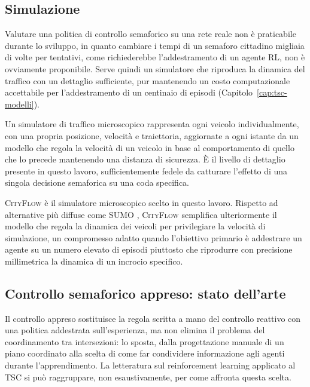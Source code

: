 \subsection{Simulazione}
\label{subsec:background-simulazione}

Valutare una politica di controllo semaforico su una rete reale non è
praticabile durante lo sviluppo, in quanto cambiare i tempi di un semaforo cittadino
migliaia di volte per tentativi, come richiederebbe l'addestramento di un
agente RL, non è ovviamente proponibile. Serve quindi un simulatore che
riproduca la dinamica del traffico con un dettaglio sufficiente, pur
mantenendo un costo computazionale accettabile per l'addestramento di
un centinaio di episodi (Capitolo~\ref{cap:tsc-modelli}).

Un simulatore di traffico microscopico rappresenta ogni veicolo
individualmente, con una propria posizione, velocità e traiettoria,
aggiornate a ogni istante da un modello che regola la velocità di un
veicolo in base al comportamento di quello che lo precede mantenendo una distanza di sicurezza.
È il livello di dettaglio presente in questo lavoro, sufficientemente fedele da catturare l'effetto di una singola
decisione semaforica su una coda specifica.

\textsc{CityFlow} \citep{zhang2019cityflow} è il simulatore microscopico scelto in questo lavoro. Rispetto ad alternative più diffuse
come SUMO \citep{lopez2018sumo}, \textsc{CityFlow} semplifica ulteriormente il modello che regola la dinamica dei veicoli per privilegiare la velocità di simulazione,
un compromesso adatto quando l'obiettivo primario è addestrare un agente su un numero elevato di episodi piuttosto
che riprodurre con precisione millimetrica la dinamica di un incrocio specifico.

\subsection{Controllo semaforico appreso: stato dell'arte}
\label{subsec:tsc-stato-arte}

Il controllo appreso sostituisce la regola scritta a mano del controllo
reattivo con una politica addestrata sull'esperienza, ma non elimina il
problema del coordinamento tra intersezioni: lo sposta, dalla
progettazione manuale di un piano coordinato alla scelta di come far
condividere informazione agli agenti durante l'apprendimento. La
letteratura sul reinforcement learning applicato al TSC si può
raggruppare, non esaustivamente, per come affronta questa scelta.

